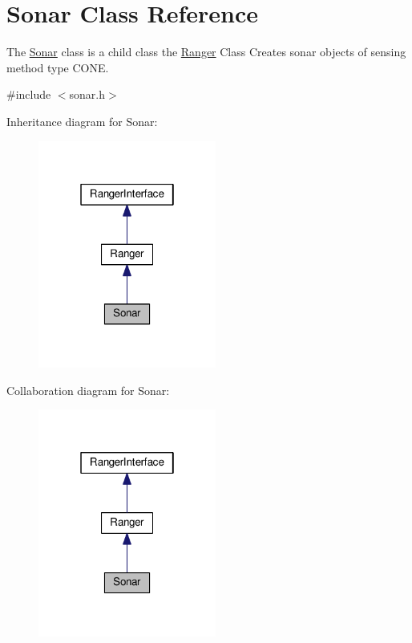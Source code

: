 \hypertarget{classSonar}{}\section{Sonar Class Reference}
\label{classSonar}


The \hyperlink{classSonar}{Sonar} class is a child class the \hyperlink{classRanger}{Ranger} Class Creates sonar objects of sensing method type C\+O\+NE.  




{\ttfamily \#include $<$sonar.\+h$>$}



Inheritance diagram for Sonar\+:\nopagebreak
\begin{figure}[H]
\begin{center}
\leavevmode
\includegraphics[width=166pt]{classSonar__inherit__graph}
\end{center}
\end{figure}


Collaboration diagram for Sonar\+:\nopagebreak
\begin{figure}[H]
\begin{center}
\leavevmode
\includegraphics[width=166pt]{classSonar__coll__graph}
\end{center}
\end{figure}
